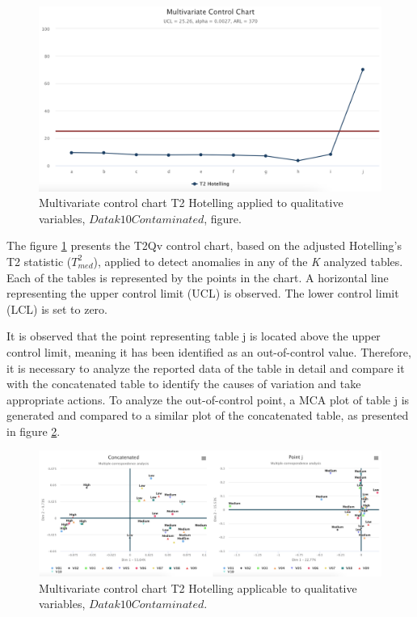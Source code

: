 \documentclass[mathematics,article,submit,moreauthors,pdftex]{mdpi}
\begin{document}
\begin{figure}[H]


\begin{center}\includegraphics[width=0.9\linewidth,]{t2} \end{center}

\caption{Multivariate control chart T2 Hotelling applied to qualitative variables, $Datak10Contaminated$, figure.}

\label{fig:tdos}
\end{figure}

The figure \ref{fig:tdos} presents the T2Qv control chart, based on the
adjusted Hotelling's T2 statistic (\(T^2_{med}\)), applied to detect
anomalies in any of the \emph{K} analyzed tables. Each of the tables is
represented by the points in the chart. A horizontal line representing
the upper control limit (UCL) is observed. The lower control limit (LCL)
is set to zero.

It is observed that the point representing table j is located above the
upper control limit, meaning it has been identified as an out-of-control
value. Therefore, it is necessary to analyze the reported data of the
table in detail and compare it with the concatenated table to identify
the causes of variation and take appropriate actions. To analyze the
out-of-control point, a MCA plot of table j is generated and compared to
a similar plot of the concatenated table, as presented in figure
\ref{fig:comparation}.

\begin{figure}[H]


\begin{center}\includegraphics[width=0.9\linewidth,]{comparation} \end{center}

\caption{Multivariate control chart T2 Hotelling applicable to qualitative variables, $Datak10Contaminated$.}

\label{fig:comparation}
\end{figure}
\end{document}
